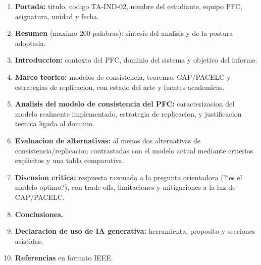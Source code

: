 \documentclass[11pt,a4paper]{article}
\begin{document}
\begin{enumerate}
    \item \textbf{Portada:} titulo, codigo TA-IND-02, nombre del estudiante, equipo PFC, asignatura, unidad y fecha.
    \item \textbf{Resumen} (maximo 200 palabras): sintesis del analisis y de la postura adoptada.
    \item \textbf{Introduccion:} contexto del PFC, dominio del sistema y objetivo del informe.
    \item \textbf{Marco teorico:} modelos de consistencia, teoremas CAP/PACELC y estrategias de replicacion, con estado del arte y fuentes academicas.
    \item \textbf{Analisis del modelo de consistencia del PFC:} caracterizacion del modelo realmente implementado, estrategia de replicacion, y justificacion tecnica ligada al dominio.
    \item \textbf{Evaluacion de alternativas:} al menos dos alternativas de consistencia/replicacion contrastadas con el modelo actual mediante criterios explicitos y una tabla comparativa.
    \item \textbf{Discusion critica:} respuesta razonada a la pregunta orientadora (?`es el modelo optimo?), con trade-offs, limitaciones y mitigaciones a la luz de CAP/PACELC.
    \item \textbf{Conclusiones.}
    \item \textbf{Declaracion de uso de IA generativa:} herramienta, proposito y secciones asistidas.
    \item \textbf{Referencias} en formato IEEE.
\end{enumerate}
\end{document}
